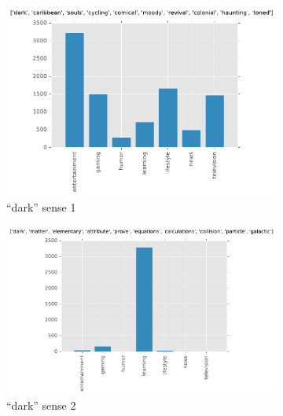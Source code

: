 \begin{landscape}

\begin{figure}[H]
\begin{subfigure}[t]{.3\textwidth}
\centering\includegraphics[]{figures/reddit-dark-0.pdf}
\caption{``dark'' sense 1}
\label{fig-reddit-dark-0}
\end{subfigure}
\begin{subfigure}[t]{.3\textwidth}
\centering\includegraphics[]{figures/reddit-dark-1.pdf}
\caption{``dark'' sense 2}
\label{fig-reddit-dark-1}
\end{subfigure}
\begin{subfigure}[t]{.3\textwidth}

\end{subfigure}
\end{figure}
\end{landscape}

